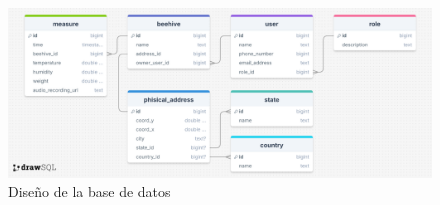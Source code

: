 \begin{figure}[!ht]
    \centering
    \includegraphics[width=\textwidth]{assets/cap_3/diseno_bd.png}
    \caption{Diseño de la base de datos}
    \label{fig:diseno_bd}
\end{figure}